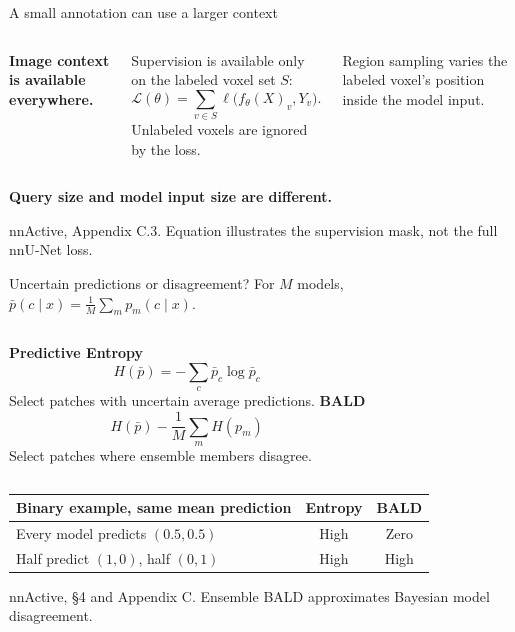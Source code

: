 \documentclass[aspectratio=169,11pt]{beamer}
\newcommand{\source}[1]{\vfill{\color{Muted}\fontsize{7}{9}\selectfont #1\par}}
\newcommand{\takeaway}[1]{\vspace{0.2cm}\begin{center}{\color{Accent}\large\bfseries #1}\end{center}}
\begin{document}
\begin{frame}{A small annotation can use a larger context}
\begin{columns}[c,onlytextwidth]
\centering
{}
\textbf{Image context is available everywhere.}\par\vspace{.2cm}
Supervision is available only on the labeled voxel set $S$:
\[\mathcal L(\theta)=\sum_{v\in S}\ell\bigl(f_\theta(X)_v,Y_v\bigr).\]
\small Unlabeled voxels are ignored by the loss.\par\vspace{.25cm}
Region sampling varies the labeled voxel's position inside the model input.
\end{columns}
\takeaway{Query size and model input size are different.}
\source{nnActive, Appendix C.3. Equation illustrates the supervision mask, not the full nnU-Net loss.}
\end{frame}

\begin{frame}{Uncertain predictions or disagreement?}
\small For $M$ models, $\bar p(c\mid x)=\frac1M\sum_m p_m(c\mid x)$.
\vspace{.2cm}
\begin{columns}[T,onlytextwidth]
{\color{Accent}\large\textbf{Predictive Entropy}}
\[H(\bar p)=-\sum_c\bar p_c\log\bar p_c\]
Select patches with uncertain average predictions.
{\color{Teal}\large\textbf{BALD}}
\[H(\bar p)-\frac1M\sum_m H(p_m)\]
Select patches where ensemble members disagree.
\end{columns}
\vspace{.35cm}\small\renewcommand{\arraystretch}{1.35}
\begin{tabular}{p{.59\linewidth}cc}
\textbf{Binary example, same mean prediction} & \textbf{Entropy} & \textbf{BALD}\\\midrule
Every model predicts $(0.5,0.5)$ & High & Zero\\
Half predict $(1,0)$, half $(0,1)$ & High & High\\
\end{tabular}
\source{nnActive, \S4 and Appendix C. Ensemble BALD approximates Bayesian model disagreement.}
\end{frame}
\end{document}
